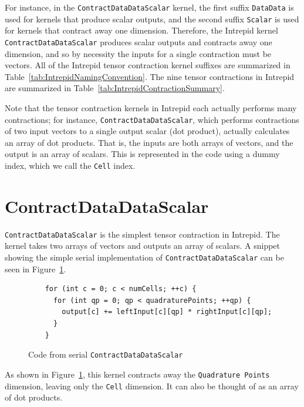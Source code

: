 For instance, in the \texttt{ContractDataDataScalar} kernel, the first suffix
\texttt{DataData} is used for kernels that produce scalar outputs, and the
second suffix \texttt{Scalar} is used for kernels that contract away one
dimension. Therefore, the Intrepid kernel \texttt{ContractDataDataScalar}
produces scalar outputs and contracts away one dimension, and so by necessity
the inputs for a single contraction must be vectors. All of the Intrepid tensor
contraction kernel suffixes are summarized in
Table~\ref{tab:IntrepidNamingConvention}. The nine tensor contractions in
Intrepid are summarized in Table~\ref{tab:IntrepidContractionSummary}.

Note that the tensor contraction kernels in Intrepid each actually performs many
contractions; for instance, \texttt{ContractDataDataScalar}, which performs
contractions of two input vectors to a single output scalar (dot product),
actually calculates an array of dot products. That is, the inputs are both
arrays of vectors, and the output is an array of scalars. This is represented
in the code using a dummy index, which we call the \texttt{Cell} index.

\section{ContractDataDataScalar}
\texttt{ContractDataDataScalar} is the simplest tensor contraction in Intrepid.
The kernel takes two arrays of vectors and outputs an array of scalars. A
snippet showing the simple serial implementation of
\texttt{ContractDataDataScalar} can be seen in
Figure~\ref{lst:ContractDataDataScalarSerial}.

\begin{figure}[ht]
    \begin{lstlisting}
    for (int c = 0; c < numCells; ++c) {
      for (int qp = 0; qp < quadraturePoints; ++qp) {
        output[c] += leftInput[c][qp] * rightInput[c][qp];
      }
    }
    \end{lstlisting}
\caption{Code from serial \texttt{ContractDataDataScalar}
\label{lst:ContractDataDataScalarSerial}} 
\end{figure}

As shown in 
Figure~\ref{lst:ContractDataDataScalarSerial}, this kernel contracts away the
\texttt{Quadrature Points} dimension, leaving only the \texttt{Cell} dimension.
It can also be thought of as an array of dot products.

